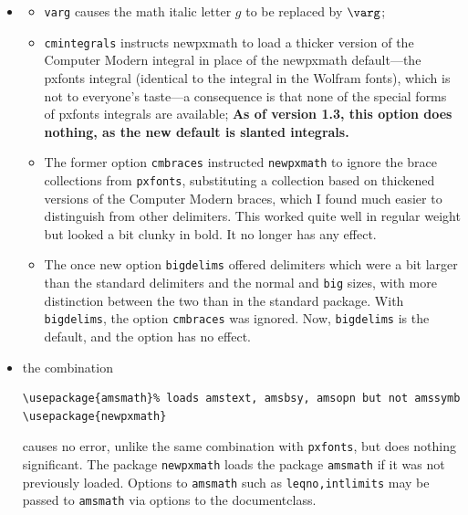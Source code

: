 \documentclass[11pt]{article}
\theoremstyle{oldplain}
\theoremstyle{plain}
\begin{document}
\begin{itemize}
\begin{verbatim}
\def\setSYdimens{\fontdimen16\font=2pt\fontdimen17\font=1.15\fontdimen17\font }
\end{verbatim}
Don't use these unless you know what you're doing.
\item 
\begin{itemize}
\item{\tt varg} causes the math italic letter $g$ to be replaced by $\varg$;
\item{\tt cmintegrals} instructs \textsf{newpxmath} to load a thicker version of the Computer Modern integral in place of the \textsf{newpxmath} default---the pxfonts integral (identical to the integral in the Wolfram fonts), which is not to everyone's taste---a consequence is that none of the special forms of \textsf{pxfonts} integrals are available; \textbf{As of version 1.3, this option does nothing, as the new default is slanted integrals.}
\item The former option {\tt cmbraces} instructed {\tt newpxmath} to ignore the brace collections from {\tt pxfonts}, substituting a collection based on thickened versions of the Computer Modern braces, which I found much easier to distinguish from other delimiters. This worked quite well in regular weight but looked a bit clunky in bold. It no longer has any effect.
\item The once new option {\tt bigdelims} offered delimiters which were a bit larger than the standard delimiters and the normal and {\tt big} sizes, with more distinction between the two than in the standard package. With {\tt bigdelims}, the option {\tt cmbraces} was ignored. Now, {\tt bigdelims} is the default, and the option has no effect.
\end{itemize}
\item the combination
\begin{verbatim}
\usepackage{amsmath}% loads amstext, amsbsy, amsopn but not amssymb
\usepackage{newpxmath}
\end{verbatim}
causes no error, unlike the same combination with {\tt pxfonts}, but does nothing significant. The package {\tt newpxmath} loads the package {\tt amsmath} if it was not previously loaded. Options to {\tt amsmath} such as {\tt leqno,intlimits} may be passed to {\tt amsmath} via options to the documentclass. 

\end{itemize}
\end{document}
